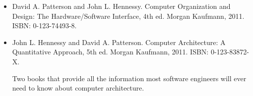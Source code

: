 \begin{itemize}
\item
David A. Patterson and John L. Hennessy. Computer Organization and Design: The Hardware/Software Interface, 4th ed. Morgan Kaufmann, 2011. ISBN: 0-123-74493-8.

\item
John L. Hennessy and David A. Patterson. Computer Architecture: A Quantitative Approach, 5th ed. Morgan Kaufmann, 2011. ISBN: 0-123-83872-X.

Two books that provide all the information most software engineers will ever need to know about computer architecture.
\end{itemize}

